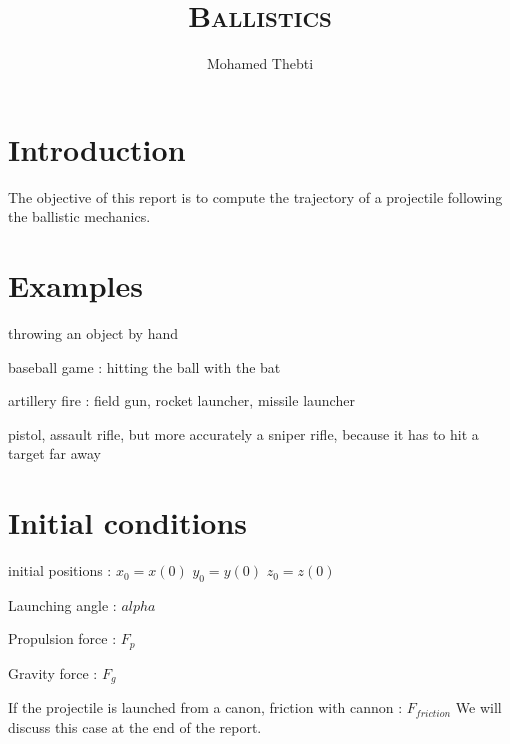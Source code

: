 \documentclass[12pt,a4paper]{article}
\title{
	\Huge\textsc{Ballistics}
}
\author{Mohamed Thebti}
\begin{document}
\setlength{\parindent}{0mm}

\fancyhead[R]{\slshape \leftmark}

\fancyfoot[C]{}
\fancyfoot[R]{\thepage}

\maketitle
\newpage

\tableofcontents

\newpage



\section{Introduction}

The objective of this report is to compute the trajectory of a projectile following the ballistic mechanics. 


\section{Examples}

throwing an object by hand

baseball game : hitting the ball with the bat

artillery fire : field gun, rocket launcher, missile launcher

pistol, assault rifle, but more accurately a sniper rifle, because it has to hit a target far away



\section{Initial conditions}

initial positions : 
$x_0 = x(0)$ 
$y_0 = y(0)$ 
$z_0 = z(0)$

Launching angle : $alpha$

Propulsion force : $F_p$

Gravity force : $F_g$

If the projectile is launched from a canon, 
friction with cannon : $F_{friction}$
We will discuss this case at the end of the report. 
\end{document}
